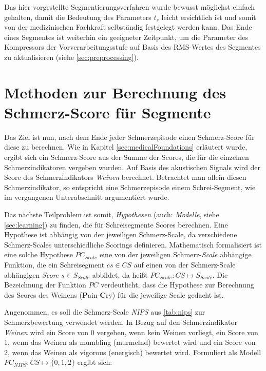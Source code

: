 Das hier vorgestellte Segmentierungsverfahren wurde bewusst möglichst einfach gehalten, damit die Bedeutung des Parameters $t_{s}$ leicht ersichtlich ist und somit von der medizinischen Fachkraft selbständig festgelegt werden kann. Das Ende eines Segmentes ist weiterhin ein geeigneter Zeitpunkt, um die Parameter des Kompressors der Vorverarbeitungsstufe auf Basis des RMS-Wertes des Segmentes zu aktualisieren (siehe \autoref{sec:preprocessing}).


\section{Methoden zur Berechnung des Schmerz-Score für Segmente}
\label{sec:overviewPainRegression}

Das Ziel ist nun, nach dem Ende jeder Schmerzepisode einen Schmerz-Score für diese zu berechnen. Wie in Kapitel \ref{sec:medicalFoundations} erläutert wurde, ergibt sich ein Schmerz-Score aus der Summe der Scores, die für die einzelnen Schmerzindikatoren vergeben wurden. Auf Basis des akustischen Signals wird der Score des Schmerzindikators \emph{Weinen} berechnet. Betrachtet man allein diesen Schmerzindikator, so entspricht eine Schmerzepisode einem Schrei-Segment, wie im vergangenen Unterabschnitt argumentiert wurde.

Das nächste Teilproblem ist somit, \emph{Hypothesen} (auch: \emph{Modelle}, siehe \autoref{sec:learning}) zu finden, die für Schreisegmente Scores berechnen. Eine Hypothese ist abhängig von der jeweiligen Schmerz-Scale, da verschiedene Schmerz-Scales unterschiedliche Scorings definieren. Mathematisch formalisiert ist eine solche Hypothese $PC_{Scale}$ eine von der jeweiligen Schmerz-\emph{Scale} abhängige Funktion, die ein Schreisegment $cs \in CS$ auf einen von der Schmerz-Scale abhängigen \emph{Score} $s \in S_{Scale}$ abbildet, da heißt $PC_{Scale}: CS \mapsto S_{Scale}$. Die Bezeichnung der Funktion $PC$ verdeutlicht, dass die Hypothese zur Berechnung des Scores des Weinens (\textbf{P}ain-\textbf{C}ry) für die jeweilige Scale gedacht ist.

Angenommen, es soll die Schmerz-Scale \emph{NIPS} aus \autoref{tab:nips} zur Schmerzbewertung verwendet werden. In Bezug auf den Schmerzindikator \emph{Weinen} wird ein Score von 0 vergeben, wenn kein Weinen vorliegt, ein Score von 1, wenn das Weinen als \glqq mumbling\grqq{} (murmelnd) bewertet wird und ein Score von 2, wenn das Weinen als \glqq vigorous\grqq{} (energisch) bewertet wird. Formuliert als Modell $PC_{NIPS}:CS \mapsto \{0, 1 , 2\}$ ergibt sich:

